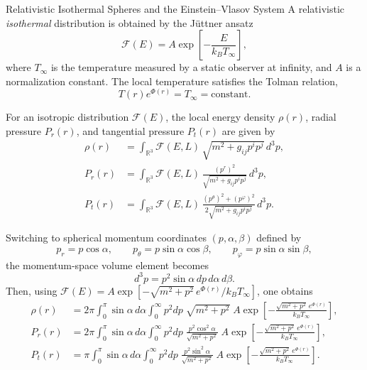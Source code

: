 \documentclass[12pt,a4paper]{article}
\numberwithin{equation}{section}
\begin{document}
\begin{section}{Relativistic Isothermal Spheres and the Einstein--Vlasov System}
A relativistic \emph{isothermal} distribution is obtained by the Jüttner ansatz
\begin{equation}
\mathcal{F}(E) = A \exp\!\left[-\frac{E}{k_B T_\infty}\right],
\end{equation}
where $T_\infty$ is the temperature measured by a static observer at infinity, and $A$ is a normalization constant. The local temperature satisfies the Tolman relation,
\begin{equation}
T(r) e^{\Phi(r)} = T_\infty = \text{constant}.
\end{equation}

For an isotropic distribution $\mathcal{F}(E)$, the local energy density $\rho(r)$, radial pressure $P_r(r)$, and tangential pressure $P_t(r)$ are given by
\begin{align}
\rho(r) &= \int_{\mathbb{R}^3}
\mathcal{F}(E,L) \, \sqrt{m^2 + g_{ij} p^i p^j} \, d^3p, \\
P_r(r) &= \int_{\mathbb{R}^3}
\mathcal{F}(E,L) \,
\frac{(p^r)^2}{\sqrt{m^2 + g_{ij} p^i p^j}} \, d^3p, \\
P_t(r) &= \int_{\mathbb{R}^3}
\mathcal{F}(E,L) \,
\frac{(p^\theta)^2 + (p^\varphi)^2}{2\sqrt{m^2 + g_{ij} p^i p^j}} \, d^3p.
\end{align}

Switching to spherical momentum coordinates $(p, \alpha, \beta)$ defined by
\begin{equation}
p_r = p \cos\alpha, \qquad
p_\theta = p \sin\alpha \cos\beta, \qquad
p_\varphi = p \sin\alpha \sin\beta,
\end{equation}
the momentum-space volume element becomes
\begin{equation}
d^3p = p^2 \sin\alpha \, dp \, d\alpha \, d\beta.
\end{equation}
Then, using $\mathcal{F}(E) = A \exp[-\sqrt{m^2 + p^2} \, e^{\Phi(r)} / k_B T_\infty]$, one obtains
\begin{align}
\rho(r) &= 2\pi \int_0^\pi \sin\alpha \, d\alpha
\int_0^\infty p^2 dp \;
\sqrt{m^2 + p^2} \;
A \exp\!\left[-\frac{\sqrt{m^2 + p^2} \, e^{\Phi(r)}}{k_B T_\infty}\right], \\
P_r(r) &= 2\pi \int_0^\pi \sin\alpha \, d\alpha
\int_0^\infty p^2 dp \;
\frac{p^2 \cos^2\alpha}{\sqrt{m^2 + p^2}} \;
A \exp\!\left[-\frac{\sqrt{m^2 + p^2} \, e^{\Phi(r)}}{k_B T_\infty}\right], \\
P_t(r) &= \pi \int_0^\pi \sin\alpha \, d\alpha
\int_0^\infty p^2 dp \;
\frac{p^2 \sin^2\alpha}{\sqrt{m^2 + p^2}} \;
A \exp\!\left[-\frac{\sqrt{m^2 + p^2} \, e^{\Phi(r)}}{k_B T_\infty}\right].
\end{align}


\end{section}
\end{document}
